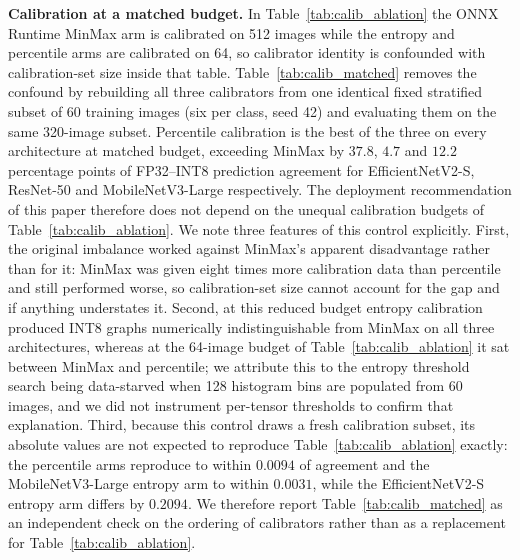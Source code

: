 \documentclass[fleqn,10pt]{wlscirep}
\begin{document}
\textbf{Calibration at a matched budget.} In Table~\ref{tab:calib_ablation} the ONNX Runtime MinMax arm is calibrated on 512 images while the entropy and percentile arms are calibrated on 64, so calibrator identity is confounded with calibration-set size inside that table. Table~\ref{tab:calib_matched} removes the confound by rebuilding all three calibrators from one identical fixed stratified subset of 60 training images (six per class, seed 42) and evaluating them on the same 320-image subset. Percentile calibration is the best of the three on every architecture at matched budget, exceeding MinMax by $37.8$, $4.7$ and $12.2$ percentage points of FP32--INT8 prediction agreement for EfficientNetV2-S, ResNet-50 and MobileNetV3-Large respectively. The deployment recommendation of this paper therefore does not depend on the unequal calibration budgets of Table~\ref{tab:calib_ablation}. We note three features of this control explicitly. First, the original imbalance worked against MinMax's apparent disadvantage rather than for it: MinMax was given eight times more calibration data than percentile and still performed worse, so calibration-set size cannot account for the gap and if anything understates it. Second, at this reduced budget entropy calibration produced INT8 graphs numerically indistinguishable from MinMax on all three architectures, whereas at the 64-image budget of Table~\ref{tab:calib_ablation} it sat between MinMax and percentile; we attribute this to the entropy threshold search being data-starved when 128 histogram bins are populated from 60 images, and we did not instrument per-tensor thresholds to confirm that explanation. Third, because this control draws a fresh calibration subset, its absolute values are not expected to reproduce Table~\ref{tab:calib_ablation} exactly: the percentile arms reproduce to within $0.0094$ of agreement and the MobileNetV3-Large entropy arm to within $0.0031$, while the EfficientNetV2-S entropy arm differs by $0.2094$. We therefore report Table~\ref{tab:calib_matched} as an independent check on the ordering of calibrators rather than as a replacement for Table~\ref{tab:calib_ablation}.
\end{document}
